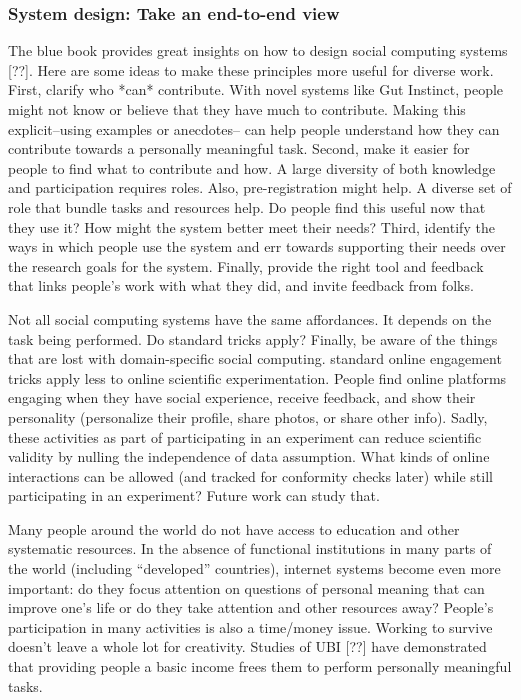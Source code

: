 \subsubsection{System design: Take an end-to-end view}
The blue book provides great insights on how to design social computing systems [??]. Here are some ideas to make these principles more useful for diverse work. First, clarify who *can* contribute. With novel systems like Gut Instinct, people might not know or believe that they have much to contribute. Making this explicit--using examples or anecdotes-- can help people understand how they can contribute towards a personally meaningful task. Second, make it easier for people to find what to contribute and how. A large diversity of both knowledge and participation requires roles. Also, pre-registration might help. A diverse set of role that bundle tasks and resources help.  Do people find this useful now that they use it? How might the system better meet their needs? Third, identify the ways in which people use the system and err towards supporting their needs over the research goals for the system. Finally, provide the right tool and feedback that links people's work with what they did, and invite feedback from folks.

Not all social computing systems have the same affordances. It depends on the task being performed. Do standard tricks apply? Finally, be aware of the things that are lost with domain-specific social computing. standard online engagement tricks apply less to online scientific experimentation. People find online platforms engaging when they have social experience, receive feedback, and show their personality (personalize their profile, share photos, or share other info). Sadly, these activities as part of participating in an experiment can reduce scientific validity by nulling the independence of data assumption. What kinds of online interactions can be allowed (and tracked for conformity checks later) while still participating in an experiment? Future work can study that.

Many people around the world do not have access to education and other systematic resources. In the absence of functional institutions in many parts of the world (including “developed” countries), internet systems become even more important:  do they focus attention on questions of personal meaning that can improve one’s life or do they take attention and other resources away? People's participation in many activities is also a time/money issue. Working to survive doesn’t leave a whole lot for creativity. Studies of UBI [??] have demonstrated that providing people a basic income frees them to perform personally meaningful tasks.

